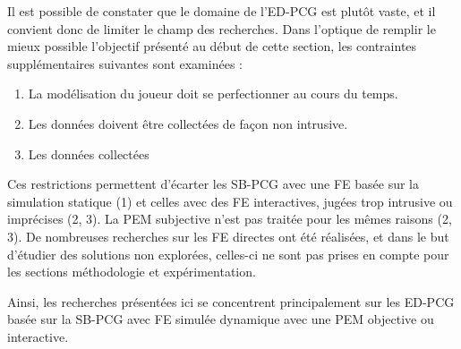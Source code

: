 \documentclass[a4paper,11pt]{article}
\begin{document}
      Il est possible de constater que le domaine de l'ED-PCG est plutôt vaste, et il convient donc de limiter le champ des recherches.
      Dans l'optique de remplir le mieux possible l'objectif présenté au début de cette section, les contraintes supplémentaires suivantes sont examinées :

      \begin{enumerate}
        \vspace{-1em}
        \item La modélisation du joueur doit se perfectionner au cours du temps.
        \vspace{-0.8em}
        \item Les données doivent être collectées de façon non intrusive.
        \vspace{-0.8em}
        \item Les données collectées
        \vspace{-1em}
      \end{enumerate}

      Ces restrictions permettent d'écarter les SB-PCG avec une FE basée sur la simulation statique (1) et celles avec des FE interactives, jugées trop intrusive ou imprécises (2, 3).
      La PEM subjective n'est pas traitée pour les mêmes raisons (2, 3).
      De nombreuses recherches sur les FE directes ont été réalisées, et dans le but d'étudier des solutions non explorées, celles-ci ne sont pas prises en compte pour les sections méthodologie et expérimentation.

      Ainsi, les recherches présentées ici se concentrent principalement sur les ED-PCG basée sur la SB-PCG avec FE simulée dynamique avec une PEM objective ou interactive. 
\end{document}
